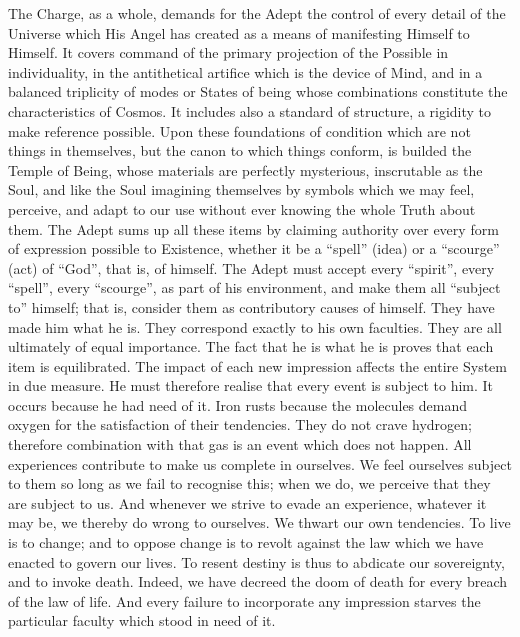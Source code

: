 The Charge, as a whole, demands for the Adept the control of every detail of the Universe which His Angel has created as a means of manifesting Himself to Himself. It covers command of the primary projection of the Possible in individuality, in the antithetical artifice which is the device of Mind, and in a balanced triplicity of modes or States of being whose combinations constitute the characteristics of Cosmos. It includes also a standard of structure, a rigidity to make reference possible. Upon these foundations of condition which are not things in themselves, but the canon to which things conform, is builded the Temple of Being, whose materials are perfectly mysterious, inscrutable as the Soul, and like the Soul imagining themselves by symbols which we may feel, perceive, and adapt to our use without ever knowing the whole Truth about them. The Adept sums up all these items by claiming authority over every form of expression possible to Existence, whether it be a \enquote{spell} (idea) or a \enquote{scourge} (act) of \enquote{God}, that is, of himself. The Adept must accept every \enquote{spirit}, every \enquote{spell}, every \enquote{scourge}, as part of his environment, and make them all \enquote{subject to} himself; that is, consider them as contributory causes of himself. They have made him what he is. They correspond exactly to his own faculties. They are all \textemdash{} ultimately \textemdash{} of equal importance. The fact that he is what he is proves that each item is equilibrated. The impact of each new impression affects the entire System in due measure. He must therefore realise that every event is subject to him. It occurs because he had need of it. Iron rusts because the molecules demand oxygen for the satisfaction of their tendencies. They do not crave hydrogen; therefore combination with that gas is an event which does not happen. All experiences contribute to make us complete in ourselves. We feel ourselves subject to them so long as we fail to recognise this; when we do, we perceive that they are subject to us. And whenever we strive to evade an experience, whatever it may be, we thereby do wrong to ourselves. We thwart our own tendencies. To live is to change; and to oppose change is to revolt against the law which we have enacted to govern our lives. To resent destiny is thus to abdicate our sovereignty, and to invoke death. Indeed, we have decreed the doom of death for every breach of the law of life. And every failure to incorporate any impression starves the particular faculty which stood in need of it.

